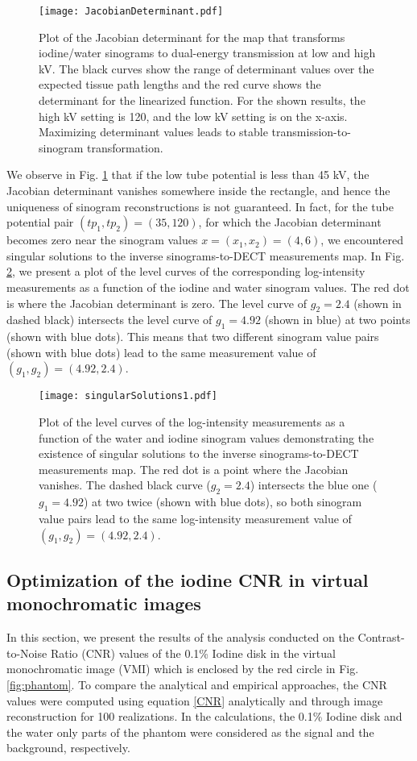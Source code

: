\documentclass[12pt,twoside]{article}   %
\begin{document}
\begin{figure}[H]
\centering
\texttt{[image: JacobianDeterminant.pdf]}
\caption{Plot of the Jacobian determinant for the
map that transforms iodine/water sinograms to
dual-energy transmission at low and high kV. The
black curves show the range of determinant values
over the expected tissue path lengths and the red
curve shows the determinant for the linearized
function. For the shown results, the high kV setting
is 120, and the low kV setting is on the x-axis.
Maximizing determinant values leads to stable
transmission-to-sinogram transformation.}
\label{fig:detJplot}
\end{figure}

We observe in Fig. \ref{fig:detJplot} that if the low tube potential is less than 45 kV, the Jacobian determinant vanishes somewhere inside the rectangle, and hence the uniqueness of sinogram reconstructions is not guaranteed. In fact, for the tube potential pair $(tp_1,tp_2)=(35,120)$, for which the Jacobian determinant becomes zero near the sinogram values $x = (x_1,x_2)=(4,6)$, we encountered singular solutions to the inverse sinograms-to-DECT measurements map. In Fig. \ref{fig:nonUniqueness}, we present a plot of the level curves of the corresponding log-intensity measurements as a function of the iodine and water sinogram values. The red dot is where the Jacobian determinant is zero.  The level curve of $g_2=2.4$ (shown in dashed black) intersects the level curve of $g_1=4.92$ (shown in blue) at two points (shown with blue dots). This means that two different sinogram value pairs (shown with blue dots) lead to the same measurement value of $(g_1,g_2)=(4.92,2.4)$.
\begin{figure}[H]
\centering
\texttt{[image: singularSolutions1.pdf]}
\caption{Plot of the level curves of the log-intensity measurements as a function of the water and iodine sinogram values demonstrating the existence of singular solutions to the inverse sinograms-to-DECT measurements map. The red dot is a point where the Jacobian vanishes. The dashed black curve ($g_2=2.4$) intersects the blue one ($g_1=4.92$) at two twice (shown with blue dots), so both sinogram value pairs lead to the same log-intensity measurement value of $(g_1,g_2)=(4.92,2.4)$.}
\label{fig:nonUniqueness}
\end{figure}
\subsection{Optimization of the iodine CNR in virtual monochromatic images}
In this section, we present the results of the analysis conducted on the Contrast-to-Noise Ratio (CNR) values of the 0.1\% Iodine disk in the virtual monochromatic image (VMI) which is enclosed by the red circle in Fig. \ref{fig:phantom}. To compare the analytical and empirical approaches, the CNR values were computed using equation \eqref{CNR} analytically and through image reconstruction for 100 realizations. In the calculations, the 0.1\% Iodine disk and the water only parts of the phantom were considered as the signal and the background, respectively. 
\end{document}
